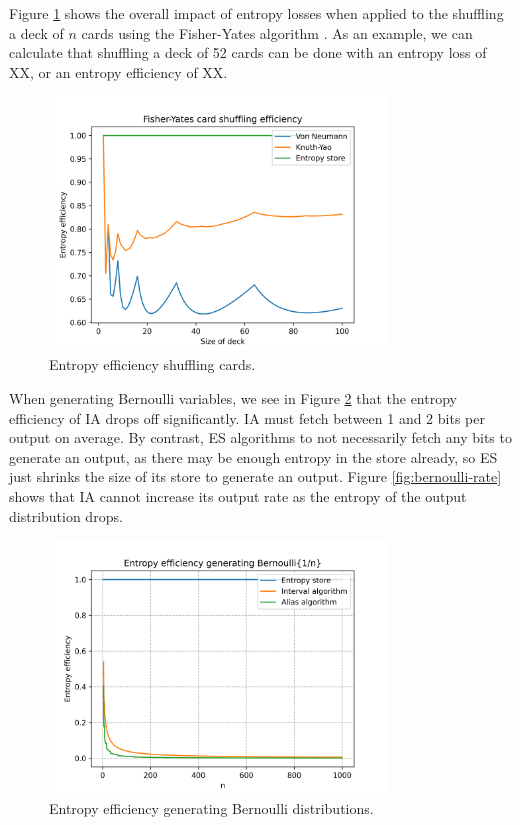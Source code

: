 \documentclass[12pt]{article}
\begin{document}
Figure \ref{fig:shuffling-efficiency} shows the overall impact of entropy losses when applied to the shuffling a deck of $n$ cards using the Fisher-Yates algorithm \cite{fisher1953statistical, durstenfeld1964algorithm, knuth2014art}. As an example, we can calculate that shuffling a deck of 52 cards can be done with an entropy loss of XX, or an entropy efficiency of XX.


\begin{figure}[ht]
\centering
\includegraphics[width=0.8\textwidth]{shuffling_efficiency.png}
\caption{Entropy efficiency shuffling cards.}
\label{fig:shuffling-efficiency}
\end{figure}

When generating Bernoulli variables, we see in Figure \ref{fig:bernoulli-efficiency} that the entropy efficiency of IA drops off significantly. IA must fetch between 1 and 2 bits per output on average. By contrast, ES algorithms to not necessarily fetch any bits to generate an output, as there may be enough entropy in the store already, so ES just shrinks the size of its store to generate an output. Figure \ref{fig:bernoulli-rate} shows that IA cannot increase its output rate as the entropy of the output distribution drops.

\begin{figure}[ht]
\centering
\includegraphics[width=0.8\textwidth]{bernoulli_efficiency.png}
\caption{Entropy efficiency generating Bernoulli distributions.}
\label{fig:bernoulli-efficiency}
\end{figure}
\end{document}
